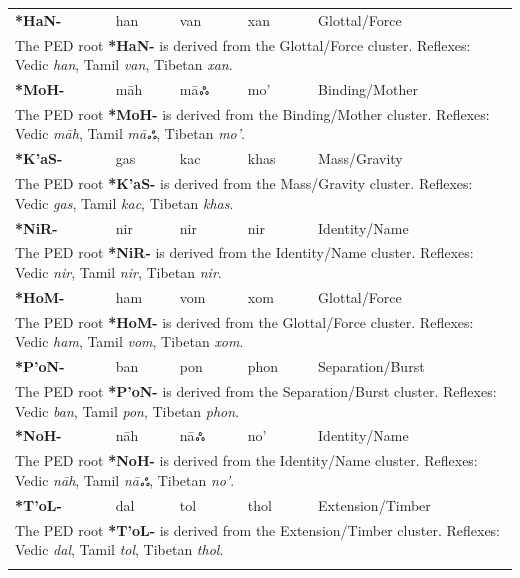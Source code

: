\begin{longtable}{p{} p{} p{} p{} p{}}
\textbf{*HaN-} & han & van & xan & Glottal/Force \\ 
\multicolumn{5}{p{\textwidth}}{\small The PED root \textbf{*HaN-} is derived from the Glottal/Force cluster. Reflexes: Vedic \textit{han}, Tamil \textit{van}, Tibetan \textit{xan}. } \\ \addlinespace 
\textbf{*MoH-} & māh & māஃ & mo' & Binding/Mother \\ 
\multicolumn{5}{p{\textwidth}}{\small The PED root \textbf{*MoH-} is derived from the Binding/Mother cluster. Reflexes: Vedic \textit{māh}, Tamil \textit{māஃ}, Tibetan \textit{mo'}. } \\ \addlinespace 
\textbf{*K'aS-} & gas & kac & khas & Mass/Gravity \\ 
\multicolumn{5}{p{\textwidth}}{\small The PED root \textbf{*K'aS-} is derived from the Mass/Gravity cluster. Reflexes: Vedic \textit{gas}, Tamil \textit{kac}, Tibetan \textit{khas}. } \\ \addlinespace 
\textbf{*NiR-} & nir & nir & nir & Identity/Name \\ 
\multicolumn{5}{p{\textwidth}}{\small The PED root \textbf{*NiR-} is derived from the Identity/Name cluster. Reflexes: Vedic \textit{nir}, Tamil \textit{nir}, Tibetan \textit{nir}. } \\ \addlinespace 
\textbf{*HoM-} & ham & vom & xom & Glottal/Force \\ 
\multicolumn{5}{p{\textwidth}}{\small The PED root \textbf{*HoM-} is derived from the Glottal/Force cluster. Reflexes: Vedic \textit{ham}, Tamil \textit{vom}, Tibetan \textit{xom}. } \\ \addlinespace 
\textbf{*P'oN-} & ban & pon & phon & Separation/Burst \\ 
\multicolumn{5}{p{\textwidth}}{\small The PED root \textbf{*P'oN-} is derived from the Separation/Burst cluster. Reflexes: Vedic \textit{ban}, Tamil \textit{pon}, Tibetan \textit{phon}. } \\ \addlinespace 
\textbf{*NoH-} & nāh & nāஃ & no' & Identity/Name \\ 
\multicolumn{5}{p{\textwidth}}{\small The PED root \textbf{*NoH-} is derived from the Identity/Name cluster. Reflexes: Vedic \textit{nāh}, Tamil \textit{nāஃ}, Tibetan \textit{no'}. } \\ \addlinespace 
\textbf{*T'oL-} & dal & tol & thol & Extension/Timber \\ 
\multicolumn{5}{p{\textwidth}}{\small The PED root \textbf{*T'oL-} is derived from the Extension/Timber cluster. Reflexes: Vedic \textit{dal}, Tamil \textit{tol}, Tibetan \textit{thol}. } \\ \addlinespace 

\end{longtable}
